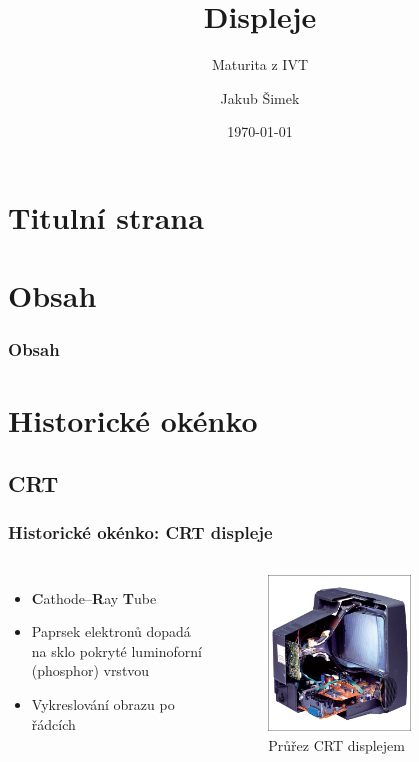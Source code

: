 \documentclass[aspectratio=169,11pt, allowframebreak=0.9]{beamer}
\title{Displeje}
\subtitle{Maturita z IVT}
\author{Jakub Šimek}
\institute[GEVO]{Gymnázium Evolution Jižní Město}
\date{\today}
\begin{document}
\normalfont
\section*{Titulní strana}
\begin{frame}
\titlepage
\end{frame}

\section*{Obsah}
\begin{frame}
\frametitle{Obsah}
\tableofcontents
\end{frame}
\section{Historické okénko}
\subsection{CRT}
\begin{frame}
\frametitle{Historické okénko: CRT displeje}
\begin{columns}
\begin{itemize}
    \item \textbf{C}athode--\textbf{R}ay \textbf{T}ube
    \item Paprsek elektronů dopadá na sklo pokryté luminoforní (phosphor) vrstvou
    \item Vykreslování obrazu po řádcích
\end{itemize}
\begin{figure}
    \centering
    \includegraphics[width=0.7\textwidth]{crt.jpg}
    \caption{Průřez CRT displejem}
\end{figure}
\end{columns}
\end{frame}
\end{document}
